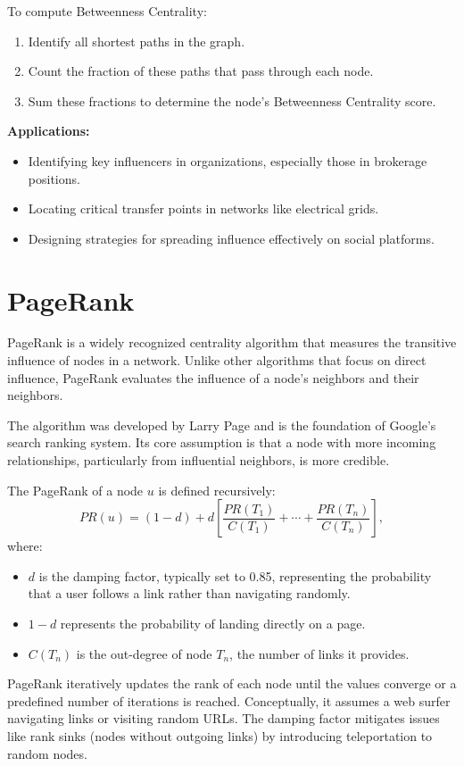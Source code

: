 To compute Betweenness Centrality:
\begin{enumerate}
    \item Identify all shortest paths in the graph.
    \item Count the fraction of these paths that pass through each node.
    \item Sum these fractions to determine the node's Betweenness Centrality score.
\end{enumerate}

\textbf{Applications:}
\begin{itemize}
    \item Identifying key influencers in organizations, especially those in brokerage positions.
    \item Locating critical transfer points in networks like electrical grids.
    \item Designing strategies for spreading influence effectively on social platforms.
\end{itemize}

\section{PageRank}
PageRank is a widely recognized centrality algorithm that measures the transitive influence of nodes in a network. Unlike other algorithms that focus on direct influence, PageRank evaluates the influence of a node’s neighbors and their neighbors.

The algorithm was developed by Larry Page and is the foundation of Google’s search ranking system. Its core assumption is that a node with more incoming relationships, particularly from influential neighbors, is more credible.

The PageRank of a node \( u \) is defined recursively:
\[
PR(u) = (1 - d) + d \left[ \frac{PR(T_1)}{C(T_1)} + \cdots + \frac{PR(T_n)}{C(T_n)} \right],
\]
where:
\begin{itemize}
    \item \( d \) is the damping factor, typically set to 0.85, representing the probability that a user follows a link rather than navigating randomly.
    \item \( 1 - d \) represents the probability of landing directly on a page.
    \item \( C(T_n) \) is the out-degree of node \( T_n \), the number of links it provides.
\end{itemize}

PageRank iteratively updates the rank of each node until the values converge or a predefined number of iterations is reached. Conceptually, it assumes a web surfer navigating links or visiting random URLs. The damping factor mitigates issues like rank sinks (nodes without outgoing links) by introducing teleportation to random nodes.

